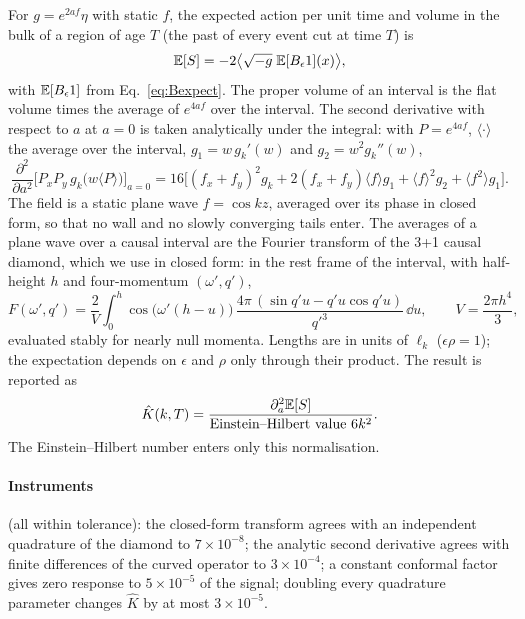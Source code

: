 For $g=e^{2af}\eta$ with static $f$, the expected action per unit time and volume in the bulk of a region
of age $T$ (the past of every event cut at time $T$) is
\begin{equation}
  \mathbb{E}[S]=-2\big\langle\sqrt{-g}\;\mathbb{E}[B_\epsilon1](x)\big\rangle,
\end{equation}
with $\mathbb{E}[B_\epsilon1]$ from Eq.~\eqref{eq:Bexpect}. The proper volume of an interval is the flat
volume times the average of $e^{4af}$ over the interval. The second derivative with respect to $a$ at
$a=0$ is taken analytically under the integral: with $P=e^{4af}$, $\langle\cdot\rangle$ the average over the
interval, $g_1=w\,g_k'(w)$ and $g_2=w^2g_k''(w)$,
\begin{equation}
  \frac{\partial^2}{\partial a^2}\Big[P_xP_y\,g_k\big(w\langle P\rangle\big)\Big]_{a=0}
  =16\Big[(f_x+f_y)^2g_k+2(f_x+f_y)\langle f\rangle g_1+\langle f\rangle^2g_2+\langle f^2\rangle g_1\Big].
\end{equation}
The field is a static plane wave $f=\cos kz$, averaged over its phase in closed form, so that no wall
and no slowly converging tails enter. The averages of a plane wave over a causal interval are the
Fourier transform of the 3+1 causal diamond, which we use in closed form: in the rest frame of the
interval, with half-height $h$ and four-momentum $(\omega',q')$,
\begin{equation}
  F(\omega',q')=\frac{2}{V}\int_0^h\cos\big(\omega'(h-u)\big)\,
  \frac{4\pi\,(\sin q'u-q'u\cos q'u)}{q'^3}\,\dd u ,\qquad V=\frac{2\pi h^4}{3},
\end{equation}
evaluated stably for nearly null momenta. Lengths are in units of $\ell_k$ ($\epsilon\rho=1$); the
expectation depends on $\epsilon$ and $\rho$ only through their product. The result is reported as
\begin{equation}
  \hat K(k,T)=\frac{\partial_a^2\mathbb{E}[S]}{\text{Einstein--Hilbert value }6k^2}.
\end{equation}
The Einstein--Hilbert number enters only this normalisation.

\paragraph{Instruments} (all within tolerance): the closed-form transform agrees with an independent
quadrature of the diamond to $7\times10^{-8}$; the analytic second derivative agrees with finite
differences of the curved operator to $3\times10^{-4}$; a constant conformal factor gives zero response
to $5\times10^{-5}$ of the signal; doubling every quadrature parameter changes $\hat K$ by at most
$3\times10^{-5}$.

